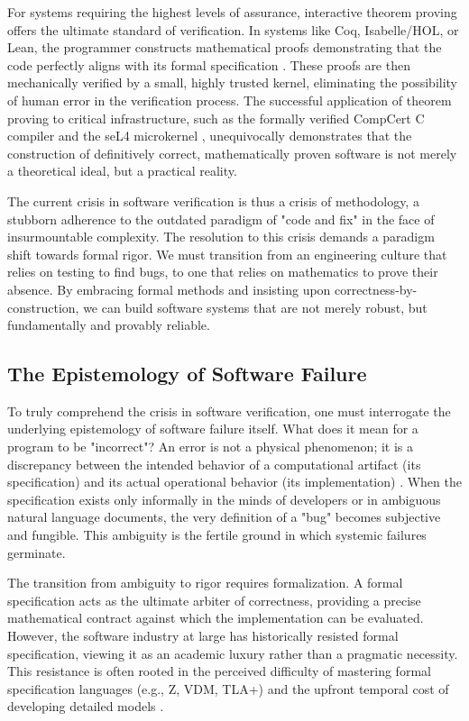 For systems requiring the highest levels of assurance, interactive theorem proving offers the ultimate standard of verification. In systems like Coq, Isabelle/HOL, or Lean, the programmer constructs mathematical proofs demonstrating that the code perfectly aligns with its formal specification \cite{nipkow2002isabelle}. These proofs are then mechanically verified by a small, highly trusted kernel, eliminating the possibility of human error in the verification process. The successful application of theorem proving to critical infrastructure, such as the formally verified CompCert C compiler \cite{leroy2009formal} and the seL4 microkernel \cite{klein2009sel4}, unequivocally demonstrates that the construction of definitively correct, mathematically proven software is not merely a theoretical ideal, but a practical reality. 

The current crisis in software verification is thus a crisis of methodology, a stubborn adherence to the outdated paradigm of "code and fix" in the face of insurmountable complexity. The resolution to this crisis demands a paradigm shift towards formal rigor. We must transition from an engineering culture that relies on testing to find bugs, to one that relies on mathematics to prove their absence. By embracing formal methods and insisting upon correctness-by-construction, we can build software systems that are not merely robust, but fundamentally and provably reliable.

\subsection{The Epistemology of Software Failure}

To truly comprehend the crisis in software verification, one must interrogate the underlying epistemology of software failure itself. What does it mean for a program to be "incorrect"? An error is not a physical phenomenon; it is a discrepancy between the intended behavior of a computational artifact (its specification) and its actual operational behavior (its implementation) \cite{fetzer1988program}. When the specification exists only informally in the minds of developers or in ambiguous natural language documents, the very definition of a "bug" becomes subjective and fungible. This ambiguity is the fertile ground in which systemic failures germinate.

The transition from ambiguity to rigor requires formalization. A formal specification acts as the ultimate arbiter of correctness, providing a precise mathematical contract against which the implementation can be evaluated. However, the software industry at large has historically resisted formal specification, viewing it as an academic luxury rather than a pragmatic necessity. This resistance is often rooted in the perceived difficulty of mastering formal specification languages (e.g., Z, VDM, TLA+) and the upfront temporal cost of developing detailed models \cite{spivey1992z, jones1990systematic, lamport2002specifying}.

